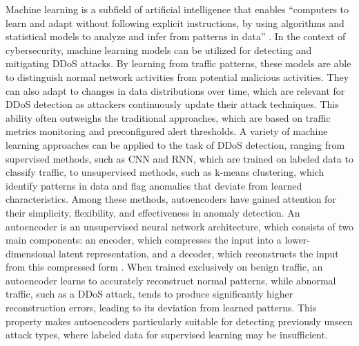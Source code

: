 Machine learning is a subfield of artificial intelligence that enables “computers to learn and adapt without following explicit instructions, by using algorithms and statistical models to analyze and infer from patterns in data” \citep{oed-machine-learning}. In the context of cybersecurity, machine learning models can be utilized for detecting and mitigating DDoS attacks. By learning from traffic patterns, these models are able to distinguish normal network activities from potential malicious activities. They can also adapt to changes in data distributions over time, which are relevant for DDoS detection as attackers continuously update their attack techniques. This ability often outweighs the traditional approaches, which are based on traffic metrics monitoring and preconfigured alert thresholds. A variety of machine learning approaches can be applied to the task of DDoS detection, ranging from supervised methods, such as CNN and RNN, which are trained on labeled data to classify traffic, to unsupervised methods, such as k-means clustering, which identify patterns in data and flag anomalies that deviate from learned characteristics. Among these methods, autoencoders have gained attention for their simplicity, flexibility, and effectiveness in anomaly detection. An autoencoder is an unsupervised neural network architecture, which consists of two main components: an encoder, which compresses the input into a lower-dimensional latent representation, and a decoder, which reconstructs the input from this compressed form \citep{michelucci2022introductionautoencoders}. When trained exclusively on benign traffic, an autoencoder learns to accurately reconstruct normal patterns, while abnormal traffic, such as a DDoS attack, tends to produce significantly higher reconstruction errors, leading to its deviation from learned patterns. This property makes autoencoders particularly suitable for detecting previously unseen attack types, where labeled data for supervised learning may be insufficient.

